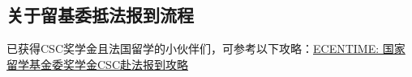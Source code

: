 \subsection{关于留基委抵法报到流程}

已获得CSC奖学金且法国留学的小伙伴们，可参考以下攻略：\href{https://www.ecentime.com/article/CSC-China-Scholarship}{ECENTIME: 国家留学基金委奖学金CSC赴法报到攻略} 
